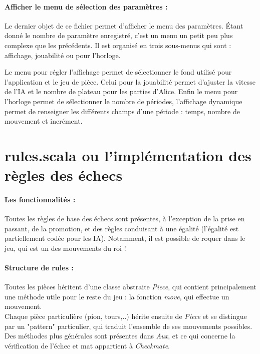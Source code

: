 \documentclass[a4paper]{article}
\begin{document}
\paragraph{Afficher le menu de sélection des paramètres :}Le dernier objet de ce fichier permet d'afficher le menu des paramètres. Étant donné le nombre de paramètre enregistré, c'est un menu un petit peu plus complexe que les précédents. Il est organisé en trois sous-menus qui sont : affichage, jouabilité ou pour l'horloge. 

Le menu pour régler l'affichage permet de sélectionner le fond utilisé pour l'application et le jeu de pièce. Celui pour la jouabilité permet d'ajuster la vitesse de l'IA et le nombre de plateau pour les parties d'Alice. Enfin le menu pour l'horloge permet de sélectionner le nombre de périodes, l'affichage dynamique permet de renseigner les différents champs d'une période : temps, nombre de mouvement et incrément. 

\section{rules.scala ou l'implémentation des règles des échecs}

\paragraph{Les fonctionnalités :} Toutes les règles de base des échecs sont présentes, à l'exception de la prise en passant, de la promotion, et des règles conduisant à une égalité (l'égalité est partiellement codée pour les IA). Notamment, il est possible de roquer dans le jeu, qui est un des mouvements du roi !

\paragraph{Structure de rules :} Toutes les pièces héritent d'une classe abstraite \textit{Piece}, qui contient principalement une méthode utile pour le reste du jeu : la fonction \textit{move}, qui effectue un mouvement. \\
Chaque pièce particulière (pion, tours,..) hérite ensuite de \textit{Piece} et se distingue par un "pattern" particulier, qui traduit l'ensemble de ses mouvements possibles. \\

Des méthodes plus générales sont présentes dans \textit{Aux}, et ce qui concerne la vérification de l'échec et mat appartient à \textit{Checkmate}.
\end{document}
